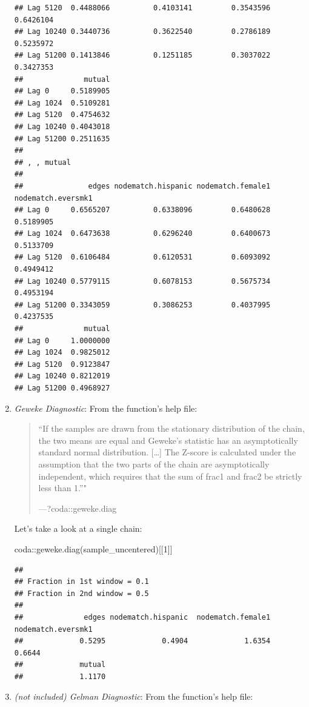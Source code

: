 \documentclass[
]{book}
\newenvironment{Shaded}{\begin{snugshade}}{\end{snugshade}}
\newcommand{\DecValTok}[1]{\textcolor[rgb]{0.00,0.00,0.81}{#1}}
\newcommand{\FunctionTok}[1]{\textcolor[rgb]{0.00,0.00,0.00}{#1}}
\newcommand{\NormalTok}[1]{#1}
\newcommand{\SpecialCharTok}[1]{\textcolor[rgb]{0.00,0.00,0.00}{#1}}
\begin{document}
\begin{enumerate}
\begin{verbatim}
## Lag 5120  0.4488066          0.4103141         0.3543596          0.6426104
## Lag 10240 0.3440736          0.3622540         0.2786189          0.5235972
## Lag 51200 0.1413846          0.1251185         0.3037022          0.3427353
##              mutual
## Lag 0     0.5189905
## Lag 1024  0.5109281
## Lag 5120  0.4754632
## Lag 10240 0.4043018
## Lag 51200 0.2511635
## 
## , , mutual
## 
##               edges nodematch.hispanic nodematch.female1 nodematch.eversmk1
## Lag 0     0.6565207          0.6338096         0.6480628          0.5189905
## Lag 1024  0.6473638          0.6296240         0.6400673          0.5133709
## Lag 5120  0.6106484          0.6120531         0.6093092          0.4949412
## Lag 10240 0.5779115          0.6078153         0.5675734          0.4953194
## Lag 51200 0.3343059          0.3086253         0.4037995          0.4237535
##              mutual
## Lag 0     1.0000000
## Lag 1024  0.9825012
## Lag 5120  0.9123847
## Lag 10240 0.8212019
## Lag 51200 0.4968927
\end{verbatim}
\item
  \emph{Geweke Diagnostic}: From the function's help file:

  \begin{quote}
  ``If the samples are drawn from the stationary distribution of the chain, the two means are equal and Geweke's statistic has an asymptotically standard normal distribution. {[}\ldots{]}
  The Z-score is calculated under the assumption that the two parts of the chain are asymptotically independent, which requires that the sum of frac1 and frac2 be strictly less than 1.''"

  ---?coda::geweke.diag
  \end{quote}

  Let's take a look at a single chain:

\begin{Shaded}
\begin{Highlighting}[]
\NormalTok{coda}\SpecialCharTok{::}\FunctionTok{geweke.diag}\NormalTok{(sample\_uncentered)[[}\DecValTok{1}\NormalTok{]]}
\end{Highlighting}
\end{Shaded}

\begin{verbatim}
## 
## Fraction in 1st window = 0.1
## Fraction in 2nd window = 0.5 
## 
##              edges nodematch.hispanic  nodematch.female1 nodematch.eversmk1 
##             0.5295             0.4904             1.6354             0.6644 
##             mutual 
##             1.1170
\end{verbatim}
\item
  \emph{(not included) Gelman Diagnostic}: From the function's help file:


\end{enumerate}
\end{document}
